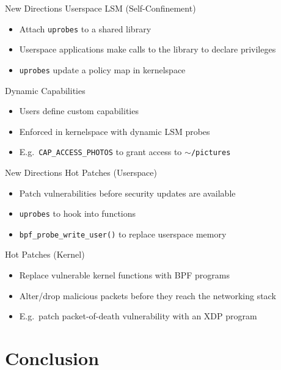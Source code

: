 \documentclass[12pt, dvipsnames, aspectratio=169]{beamer}
\begin{document}
\begin{frame}[c]{New Directions}
Userspace LSM (Self-Confinement)
\begin{itemize}
    \item Attach \texttt{uprobes} to a shared library
    \item Userspace applications make calls to the library to declare privileges
    \item \texttt{uprobes} update a policy map in kernelspace
\end{itemize}
\vfill
Dynamic Capabilities
\begin{itemize}
    \item Users define custom capabilities
    \item Enforced in kernelspace with dynamic LSM probes
    \item E.g.~\texttt{CAP\_ACCESS\_PHOTOS} to grant access to \texttt{$\sim$/pictures}
\end{itemize}
\end{frame}

\begin{frame}[c]{New Directions}
Hot Patches (Userspace)
\begin{itemize}
    \item Patch vulnerabilities before security updates are available
    \item \texttt{uprobes} to hook into functions
    \item \texttt{bpf\_probe\_write\_user()} to replace userspace memory
\end{itemize}
\vfill
Hot Patches (Kernel)
\begin{itemize}
    \item Replace vulnerable kernel functions with BPF programs
    \item Alter/drop malicious packets before they reach the networking stack
    \item E.g.~patch packet-of-death vulnerability with an XDP program
\end{itemize}
\end{frame}

\section{Conclusion}
\end{document}
